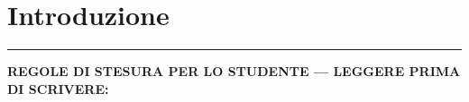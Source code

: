 \chapter{Introduzione}
\label{cap:introduzione}

\vspace{-0.3cm}
\noindent\rule{\textwidth}{1.2pt}
\vspace{0.1cm}

\textbf{\large REGOLE DI STESURA PER LO STUDENTE — LEGGERE PRIMA DI SCRIVERE:}
\vspace{0.2cm}
